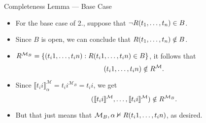 \begin{frame}{Completeness Lemma --- Base Case}

  \begin{itemize}

  \item  For the base case of 2., suppose that
                            $\neg R(t_1, \mathellipsis, t_n)\in
                            B$.

                            \item Since $B$ is open, we can conclude
                            that $R(t_1,\mathellipsis, t_n)\notin
                            B$.

                            \item $R^{\mathcal{M}_B}=\{(t_i1,
                              \mathellipsis, t_in): R(t_i1,
                              \mathellipsis, t_in)\in B\}$, it follows
                              that \[(t_i1, \mathellipsis, t_in)\notin
                              R^\mathcal{M}.\]

                              \item Since $\llbracket
                                t_ii\rrbracket^\mathcal{M}_\alpha=t_ii^{\mathcal{M}_B}=t_ii$,
                                we get \[(\llbracket
                                t_ii\rrbracket^\mathcal{M},
                                \mathellipsis, \llbracket
                                t_ii\rrbracket^\mathcal{M})\notin
                                R^{\mathcal{M}_B}.\]

                                \item But that just means that
                                  $\mathcal{M}_B,\alpha\nvDash R(t_i1,
                                  \mathellipsis, t_in)$, as desired.
   
  \end{itemize}


  
\end{frame}

